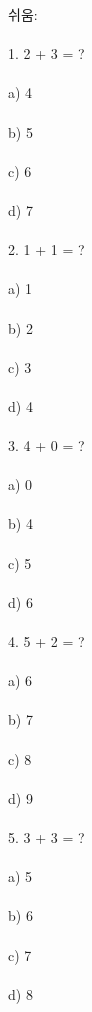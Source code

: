 \documentclass[fleqn]{article}
\begin{document}
      
        쉬움: \\\\
1. 2 + 3 = ? \\\\
   a) 4 \\\\
   b) 5 \\\\
   c) 6 \\\\
   d) 7 \\\\
  
2. 1 + 1 = ? \\\\
   a) 1 \\\\
   b) 2 \\\\
   c) 3 \\\\
   d) 4 \\\\
  
3. 4 + 0 = ? \\\\
   a) 0 \\\\
   b) 4 \\\\
   c) 5 \\\\
   d) 6 \\\\
  
4. 5 + 2 = ? \\\\
   a) 6 \\\\
   b) 7 \\\\
   c) 8 \\\\
   d) 9 \\\\
  
5. 3 + 3 = ? \\\\
   a) 5 \\\\
   b) 6 \\\\
   c) 7 \\\\
   d) 8 \\\\
  
\end{document}
